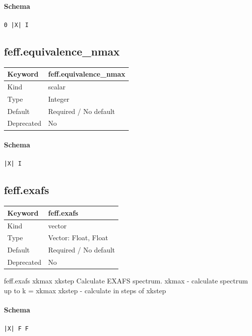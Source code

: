 \documentclass[11pt]{article}
\begin{document}
{{{\paragraph{Schema}
\begin{Verbatim}
0 |X| I
\end{Verbatim}

\subsection{feff.equivalence\_nmax}
\label{kw:feff-equivalence-nmax}
\begin{longtable}{|p{1.5in}|p{4.5in}|}
\hline
Keyword & feff.equivalence\_nmax \\
\hline
Kind & scalar \\
\hline
Type & Integer \\
\hline
Default & Required / No default \\
\hline
Deprecated & No \\
\hline
\end{longtable}
\paragraph{Schema}
\begin{Verbatim}
|X| I
\end{Verbatim}

\subsection{feff.exafs}
\label{kw:feff-exafs}
\begin{longtable}{|p{1.5in}|p{4.5in}|}
\hline
Keyword & feff.exafs \\
\hline
Kind & vector \\
\hline
Type & Vector: Float, Float \\
\hline
Default & Required / No default \\
\hline
Deprecated & No \\
\hline
\end{longtable}
 feff.exafs{ xkmax xkstep }
 Calculate EXAFS spectrum.
 xkmax  - calculate spectrum up to k = xkmax
 xkstep - calculate in steps of xkstep

\paragraph{Schema}
\begin{Verbatim}
|X| F F
\end{Verbatim}

}}}
\end{document}
